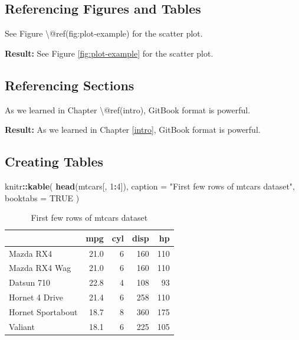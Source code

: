 \documentclass[
]{book}
\newenvironment{Shaded}{\begin{snugshade}}{\end{snugshade}}
\newcommand{\AttributeTok}[1]{\textcolor[rgb]{0.13,0.29,0.53}{#1}}
\newcommand{\ConstantTok}[1]{\textcolor[rgb]{0.56,0.35,0.01}{#1}}
\newcommand{\DecValTok}[1]{\textcolor[rgb]{0.00,0.00,0.81}{#1}}
\newcommand{\FunctionTok}[1]{\textcolor[rgb]{0.13,0.29,0.53}{\textbf{#1}}}
\newcommand{\NormalTok}[1]{#1}
\newcommand{\SpecialCharTok}[1]{\textcolor[rgb]{0.81,0.36,0.00}{\textbf{#1}}}
\newcommand{\StringTok}[1]{\textcolor[rgb]{0.31,0.60,0.02}{#1}}
\begin{document}
\subsection{Referencing Figures and Tables}\label{referencing-figures-and-tables}

\begin{Shaded}
\begin{Highlighting}[]
\NormalTok{See Figure \textbackslash{}@ref(fig:plot{-}example) for the scatter plot.}
\end{Highlighting}
\end{Shaded}

\textbf{Result:} See Figure \ref{fig:plot-example} for the scatter plot.

\subsection{Referencing Sections}\label{referencing-sections}

\begin{Shaded}
\begin{Highlighting}[]
\NormalTok{As we learned in Chapter \textbackslash{}@ref(intro), GitBook format is powerful.}
\end{Highlighting}
\end{Shaded}

\textbf{Result:} As we learned in Chapter \ref{intro}, GitBook format is powerful.

\subsection{Creating Tables}\label{creating-tables}

\begin{Shaded}
\begin{Highlighting}[]
\NormalTok{knitr}\SpecialCharTok{::}\FunctionTok{kable}\NormalTok{(}
  \FunctionTok{head}\NormalTok{(mtcars[, }\DecValTok{1}\SpecialCharTok{:}\DecValTok{4}\NormalTok{]), }
  \AttributeTok{caption =} \StringTok{"First few rows of mtcars dataset"}\NormalTok{,}
  \AttributeTok{booktabs =} \ConstantTok{TRUE}
\NormalTok{)}
\end{Highlighting}
\end{Shaded}

\begin{table}

\caption{\label{tab:cars-table}First few rows of mtcars dataset}
\centering
\begin{tabular}[t]{lrrrr}
\toprule
  & mpg & cyl & disp & hp\\
\midrule
Mazda RX4 & 21.0 & 6 & 160 & 110\\
Mazda RX4 Wag & 21.0 & 6 & 160 & 110\\
Datsun 710 & 22.8 & 4 & 108 & 93\\
Hornet 4 Drive & 21.4 & 6 & 258 & 110\\
Hornet Sportabout & 18.7 & 8 & 360 & 175\\
\addlinespace
Valiant & 18.1 & 6 & 225 & 105\\
\bottomrule
\end{tabular}
\end{table}
\end{document}

